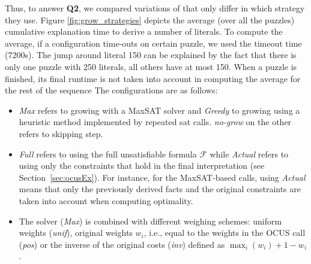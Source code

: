 Thus, to answer \textbf{Q2}, we compared variations of  \comus that only differ in which \grow strategy they use. 
Figure \ref{fig:grow_strategies} depicts the average (over all the puzzles) cumulative explanation time to derive a number of literals.
To compute the average, if a configuration time-outs on certain puzzle, we used the timeout time (7200s). 
The jump around literal 150 can be explained by the fact that there is only one puzzle with 250 literals, all others have at most 150. When a puzzle is finished, its final runtime is not taken into account in computing the average for the rest of the sequence 
The configurations are as follows:
\begin{itemize}
\item \emph{Max} refers to growing with a MaxSAT solver and \emph{Greedy} to growing using a heuristic method implemented by repeated sat calls. 
\emph{no-grow} on the other refers to skipping \grow step.
\item  \emph{Full} refers to using the full unsatisfiable formula $\mathcal{F}$  while \emph{Actual} refers to using only the constraints that hold in the final interpretation (see Section~\ref{sec:ocusEx}). For instance, for the MaxSAT-based calls, using \emph{Actual} means that only the previously derived facts and the original constraints are taken into account when computing optimality. 
\item The \maxsat solver (\emph{Max}) is combined with different weighing schemes: uniform weights (\emph{unif}), original weights $w_i$, i.e., equal to the weights in the OCUS call (\emph{pos}) or the inverse of the original costs (\emph{inv}) defined as $\max_i(w_i) + 1 - w_i$.%
\end{itemize}


